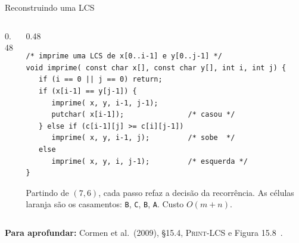 \documentclass[aspectratio=169,xcolor=table]{beamer}
\newcommand{\gradePD}[3]{%
  \foreach \y [count=\j from 1] in #2
    \node[font=\tiny\ttfamily\bfseries, gray!60!black] at ({\j*0.55},0.36) {\y};
  \foreach \x [count=\i from 1] in #1
    \node[font=\tiny\ttfamily\bfseries, gray!60!black] at (-0.45,{-\i*0.36}) {\x};
  \foreach \lin [count=\i from 0] in #3
    \foreach \v [count=\j from 0] in \lin
      \node[cel] at ({\j*0.55},{-\i*0.36}) {\v};%
}
\newcommand{\marca}[3]{\fill[#3] ({#2*0.55-0.275},{-#1*0.36-0.18}) rectangle +(0.55,0.36);}
\newcommand{\passo}[4]{\draw[-{Stealth[length=1.3mm]}, red!70!black, semithick, shorten <=1.5mm, shorten >=1.5mm]
  ({#2*0.55},{-#1*0.36}) -- ({#4*0.55},{-#3*0.36});}
\newcommand{\rotX}{A,B,C,B,D,A,B}
\newcommand{\rotY}{B,D,C,A,B,A}
\newcommand{\valoresC}{{0,0,0,0,0,0,0},{0,0,0,0,1,1,1},{0,1,1,1,1,2,2},{0,1,1,2,2,2,2},%
  {0,1,1,2,2,3,3},{0,1,2,2,2,3,3},{0,1,2,2,3,3,4},{0,1,2,2,3,4,4}}
\newcommand{\fonte}[1]{%
  \vfill
  {\tiny\color{gray!55!black}\textbf{Para aprofundar:} #1\par}%
}
\begin{document}
\begin{frame}[fragile]{Reconstruindo uma LCS}
  \begin{columns}[c]
    \begin{column}{0.48\textwidth}
      \centering
    \end{column}
    \begin{column}{0.48\textwidth}
\begin{lstlisting}[basicstyle=\ttfamily\tiny]
/* imprime uma LCS de x[0..i-1] e y[0..j-1] */
void imprime( const char x[], const char y[], int i, int j) {
   if (i == 0 || j == 0) return;
   if (x[i-1] == y[j-1]) {
      imprime( x, y, i-1, j-1);
      putchar( x[i-1]);               /* casou */
   } else if (c[i-1][j] >= c[i][j-1])
      imprime( x, y, i-1, j);         /* sobe  */
   else
      imprime( x, y, i, j-1);         /* esquerda */
}
\end{lstlisting}
      \scriptsize Partindo de $(7,6)$, cada passo refaz a decisão da recorrência. As células
      \colorbox{orange!45}{laranja} são os casamentos: \texttt{B}, \texttt{C}, \texttt{B},
      \texttt{A}. Custo $O(m+n)$.
    \end{column}
  \end{columns}
  \fonte{Cormen et al.\ (2009), \S 15.4, \textsc{Print-LCS} e Figura 15.8~\cite{cormen2009introduction}.}
\end{frame}
\end{document}
